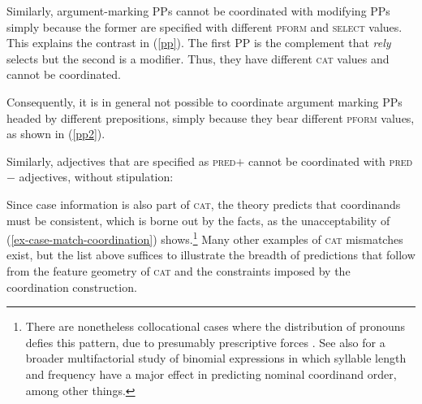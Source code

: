 Similarly, argument-marking PPs cannot be coordinated with modifying PPs simply because the former are specified with different  \textsc{pform} and \textsc{select} values. This explains the contrast
in (\ref{pp}). The first PP is the complement that \emph{rely}
selects but the second is a modifier. Thus, they have different \textsc{cat} values 
and cannot be coordinated.


\eal
\label{pp}
\zl

\noindent
Consequently, it is in general not possible to coordinate argument marking PPs headed by different prepositions, simply because they bear
different \textsc{pform} values, as shown in (\ref{pp2}).

\eal
\label{pp2}

\zl

Similarly, adjectives that are specified as \textsc{pred}$+$ cannot be
coordinated with  \textsc{pred}$-$ adjectives, without stipulation:

\eal
{}
\zl


\noindent
Since case information is also part of \textsc{cat},  the theory
predicts that coordinands must be consistent, which is borne out by the
facts, as the unacceptability of  (\ref{ex-case-match-coordination}) shows.\footnote{There are nonetheless collocational cases where the distribution of pronouns defies this pattern, due to presumably prescriptive forces \citep{grano}. See also \citet[105, 107]{binomial} for a broader multifactorial study of binomial expressions in which syllable length and  frequency have a major effect in predicting nominal coordinand order, among other things.}
 Many other examples of \textsc{cat} mismatches exist, but the  list above suffices to
illustrate the breadth of predictions that follow from the feature geometry of \textsc{cat} and the constraints imposed by
the coordination construction.

\eal
\label{ex-case-match-coordination}
\zl


